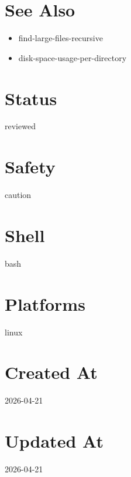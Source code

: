 \documentclass{article}
\begin{document}
\section*{See Also}
\begin{itemize}
  \item find-large-files-recursive
  \item disk-space-usage-per-directory
\end{itemize}

\section*{Status}
reviewed

\section*{Safety}
caution

\section*{Shell}
bash

\section*{Platforms}
linux

\section*{Created At}
2026-04-21

\section*{Updated At}
2026-04-21
\end{document}
